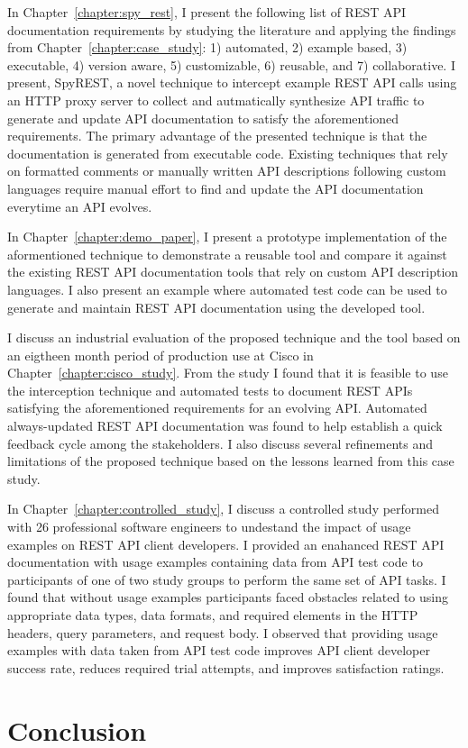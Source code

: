 \documentclass[12pt]{ucalgthes1}
\begin{document}
In Chapter~\ref{chapter:spy_rest}, I present the following list of REST API documentation requirements by studying the literature and applying the findings from Chapter~\ref{chapter:case_study}: 1) automated, 2) example based, 3) executable, 4) version aware, 5) customizable, 6) reusable, and 7) collaborative. I present, SpyREST, a novel technique to intercept example REST API calls using an HTTP proxy server to collect and autmatically synthesize API traffic to generate and update API documentation to satisfy the aforementioned requirements. The primary advantage of the presented technique is that the documentation is generated from executable code. Existing techniques that rely on formatted comments or manually written API descriptions following custom languages require manual effort to find and update the API documentation everytime an API evolves.

In Chapter~\ref{chapter:demo_paper}, I present a prototype implementation of the aformentioned technique to demonstrate a reusable tool and compare it against the existing REST API documentation tools that rely on custom API description languages. I also present an example where automated test code can be used to generate and maintain REST API documentation using the developed tool.

I discuss an industrial evaluation of the proposed technique and the tool based on an eigtheen month period of production use at Cisco in Chapter~\ref{chapter:cisco_study}. From the study I found that it is feasible to use the interception technique and automated tests to document REST APIs satisfying the aforementioned requirements for an evolving API. Automated always-updated REST API documentation was found to help establish a quick feedback cycle among the stakeholders. I also discuss several refinements and limitations of the proposed technique based on the lessons learned from this case study.

In Chapter~\ref{chapter:controlled_study}, I discuss a controlled study performed with 26 professional software engineers to undestand the impact of usage examples on REST API client developers. I provided an enahanced REST API documentation with usage examples containing data from API test code to participants of one of two study groups to perform the same set of API tasks. I found that without usage examples participants faced obstacles related to using appropriate data types, data formats, and required elements in the HTTP headers, query parameters, and request body. I observed that providing usage examples with data taken from API test code improves API client developer success rate, reduces required trial attempts, and improves satisfaction ratings.






\chapter{Conclusion}
\appendix
\end{document}
